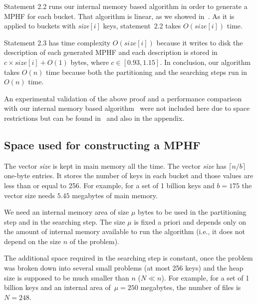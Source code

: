 Statement 2.2 runs our internal memory based algorithm in order to generate a MPHF for each bucket.
That algorithm is linear, as we showed in~\cite{bkz05}. As it is applied to buckets with {\it size}$[i]$ keys, statement~2.2 takes $O(\mathit{size}[i])$ time.

Statement 2.3 has time complexity $O(\mathit{size}[i])$ because it writes to disk 
the description of each generated MPHF and each description is stored in
$c \times \mathit{size}[i] + O(1)$ bytes, where $c\in[0.93,1.15]$.
In conclusion, our algorithm takes $O(n)$ time because both the partitioning and
the searching steps run in $O(n)$ time. 

An experimental validation of the above proof and a performance comparison with 
our internal memory based algorithm~\cite{bkz05} were not included here due to 
space restrictions but can be found in~\cite{bkz06t} and also in the appendix.

\vspace{-1mm}
\enlargethispage{2\baselineskip}
\subsection{Space used for constructing a MPHF} 
\label{sec:memconstruction}

The vector {\it size} is kept in main memory 
all the time. 
The vector {\it size} has $\lceil n/b \rceil$ one-byte entries.
It stores the number of keys in each bucket and 
those values are less than or equal to 256. 
For example, for a set of 1 billion keys and $b=175$ the vector size needs 
$5.45$ megabytes of main memory.

We need an internal memory area of size $\mu$ bytes to be used in
the partitioning step and in the searching step. 
The size $\mu$ is fixed a priori and depends only on the amount 
of internal memory available to run the algorithm
(i.e., it does not depend on the size $n$ of the problem).


The additional space required in the searching step
is constant, once the problem was broken down
into several small problems (at most 256 keys) and 
the heap size is supposed to be much smaller than $n$ ($N \ll n$).
For example, for a set of 1 billion keys and an internal area of~$\mu = 250$ megabytes,
the number of files is $N = 248$. 

